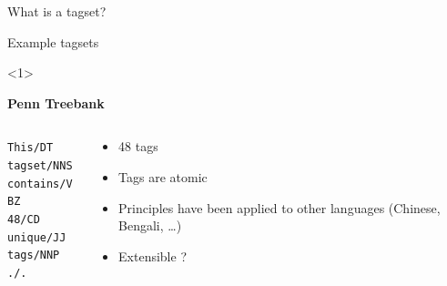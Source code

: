 \documentclass{beamer}
\begin{document}
\begin{frame}{What is a tagset?}

\end{frame}

\begin{frame}{Example tagsets}

  
\begin{onlyenv}<1>
\begin{center}
\textbf{Penn Treebank} 
\end{center}
  \begin{columns}
  
    \begin{column}{0.4\textwidth}
    
    \begin{alltt}
       This/DT \\
       tagset/NNS  \\
       contains/VBZ \\
       48/CD \\
       unique/JJ \\
       tags/NNP  \\
       ./.  \\
    \end{alltt}
    
    \end{column}
    
    \begin{column}{0.6\textwidth}
    
    \begin{itemize}
       \item 48 tags 
       \item Tags are atomic
       \item Principles have been applied to other languages (Chinese, Bengali, \ldots)
       \item Extensible ? 
    \end{itemize}
    \end{column}

  \end{columns}
  
\end{onlyenv}


\end{frame}
\end{document}
